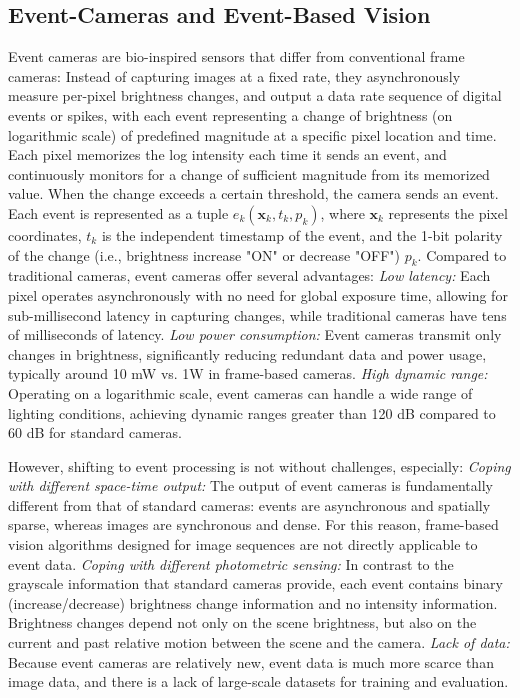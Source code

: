 \documentclass{article}
\begin{document}
\subsection{Event-Cameras and Event-Based Vision}
Event cameras are bio-inspired sensors that differ from conventional frame cameras: Instead of capturing images at a fixed rate, they asynchronously measure per-pixel brightness changes, and output a data rate sequence of digital events or spikes, with each event representing a change of brightness (on logarithmic scale) of predefined magnitude at a specific pixel location and time. Each pixel memorizes the log intensity each time it sends an event, and continuously monitors for a change of sufficient magnitude from its memorized value. When the change exceeds a certain threshold, the camera sends an event. Each event is represented as a tuple $e_k(\textbf{x}_k,t_k,p_k)$,
where $\textbf{x}_k$ represents the pixel coordinates, $t_k$ is the independent timestamp of the event, and the 1-bit polarity of the change (i.e., brightness increase "ON" or decrease "OFF") $p_k$. Compared to traditional cameras, event cameras offer several advantages: \textit{Low latency:} Each pixel operates asynchronously with no need for global exposure time, allowing for sub-millisecond latency in capturing changes, while traditional cameras have tens of milliseconds of latency. \textit{Low power consumption:} Event cameras transmit only changes in brightness, significantly reducing redundant data and power usage, typically around 10 mW vs. 1W in frame-based cameras. \textit{High dynamic range:} Operating on a logarithmic scale, event cameras can handle a wide range of lighting conditions, achieving dynamic ranges greater than 120 dB compared to 60 dB for standard cameras. 

However, shifting to event processing is not without challenges, especially: \textit{Coping with different space-time output:} The output of event cameras is fundamentally different from that of standard cameras: events are asynchronous and spatially sparse, whereas images are synchronous and dense. For this reason, frame-based vision algorithms designed for image sequences are not directly applicable to event data. \textit{Coping with different photometric sensing:} In contrast to the grayscale information that standard cameras provide, each event contains binary (increase/decrease) brightness change information and no intensity information. Brightness changes depend not only on the scene brightness, but also on the current and past relative motion between the scene and the camera. \textit{Lack of data:} Because event cameras are relatively new, event data is much more scarce than image data, and there is a lack of large-scale datasets for training and evaluation. 
\end{document}
